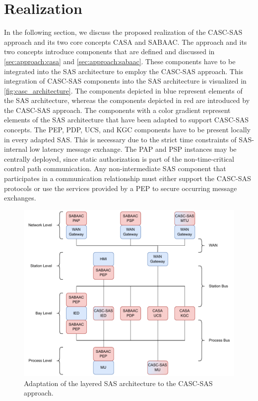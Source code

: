 \section{Realization}
\label{sec:approach:realization}
In the following section, we discuss the proposed realization of the CASC-SAS approach and its two core concepts CASA and SABAAC.
The approach and its two concepts introduce components that are defined and discussed in \autoref{sec:approach:casa} and \autoref{sec:approach:sabaac}.
These components have to be integrated into the SAS architecture to employ the CASC-SAS approach.
This integration of CASC-SAS components into the SAS architecture is visualized in \autoref{fig:casc_architecture}.
The components depicted in blue represent elements of the SAS architecture, whereas the components depicted in red are introduced by the CASC-SAS approach.
The components with a color gradient represent elements of the SAS architecture that have been adapted to support CASC-SAS concepts.
The PEP, PDP, UCS, and KGC components have to be present locally in every adapted SAS.
This is necessary due to the strict time constraints of SAS-internal low latency message exchange.
The PAP and PSP instances may be centrally deployed, since static authorization is part of the non-time-critical control path communication.
Any non-intermediate SAS component that participates in a communication relationship must either support the CASC-SAS protocols or use the services provided by a PEP to secure occurring message exchanges.
\begin{figure}
    \centering
    \includegraphics[width=0.8\linewidth]{figures/casc_architecture_color.drawio.pdf}
    \caption{Adaptation of the layered SAS architecture to the CASC-SAS approach.
    }
    \label{fig:casc_architecture}
\end{figure}

